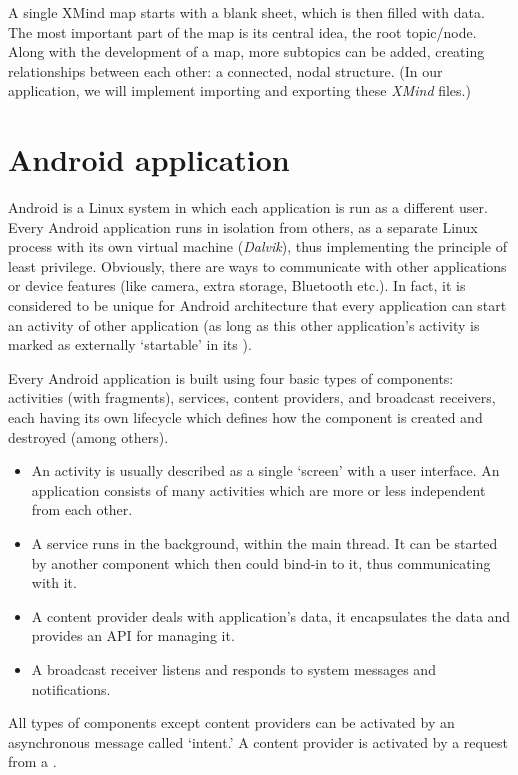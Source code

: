 A single XMind map starts with a blank sheet, which is then filled with data. The most important part of the map is its central idea, the root topic/node. Along with the development of a map, more subtopics can be added, creating relationships between each other: a connected, nodal structure. (In our application, we will implement importing and exporting these {\em XMind} files.)

\section{Android application}
\label{sec:android-theory}

Android is a Linux system in which each application is run as a different user. Every Android application runs in isolation from others, as a separate Linux process with its own virtual machine ({\em Dalvik}), thus implementing the principle of least privilege. Obviously, there are ways to communicate with other applications or device features (like camera, extra storage, Bluetooth etc.). In fact, it is considered to be unique for Android architecture that every application can start an activity of other application (as long as this other application's activity is marked as externally `startable' in its ). \cite{Collins:Android}

Every Android application is built using four basic types of components: activities (with fragments), services, content providers, and broadcast receivers, each having its own lifecycle which defines how the component is created and destroyed (among others).

\begin{itemize}
	\item An activity is usually described as a single `screen' with a user interface. An application consists of many activities which are more or less independent from each other.
	\item A service runs in the background, within the main thread. It can be started by another component which then could bind-in to it, thus communicating with it.
	\item A content provider deals with application's data, it encapsulates the data and provides an API for managing it.
	\item A broadcast receiver listens and responds to system messages and notifications.
\end{itemize}

All types of components except content providers can be activated by an asynchronous message called `intent.' A content provider is activated by a request from a .

